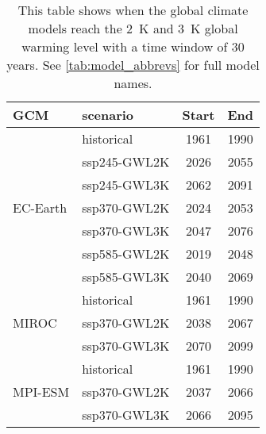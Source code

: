 \begin{table}[!htbp]
\centering
\footnotesize
\caption{This table shows when the global climate models reach the \qty{2}{\kelvin} and \qty{3}{\kelvin} global warming level with a time window of 30 years. See \autoref{tab:model_abbrevs} for full model names.}
\label{Table:GWL}
\begin{tabular}{l|l|c|c|}
\toprule
GCM & scenario & Start & End \\
\midrule
\multirow{7}{*}{EC-Earth} & historical & 1961 & 1990\\
 &  ssp245-GWL2K & 2026 & 2055\\
 &  ssp245-GWL3K & 2062 & 2091\\
 &  ssp370-GWL2K & 2024 & 2053\\
 &  ssp370-GWL3K & 2047 & 2076\\
 &  ssp585-GWL2K & 2019 & 2048\\
 &  ssp585-GWL3K & 2040 & 2069\\
\cmidrule(lr){1-4}
\multirow{3}{*}{MIROC} & historical & 1961 & 1990\\
 &  ssp370-GWL2K & 2038 & 2067\\
 &  ssp370-GWL3K & 2070 & 2099\\
\cmidrule(lr){1-4}
\multirow{3}{*}{MPI-ESM} & historical & 1961 & 1990\\
 &  ssp370-GWL2K & 2037 & 2066\\
 &  ssp370-GWL3K & 2066 & 2095\\
\bottomrule
\end{tabular}
\end{table}
